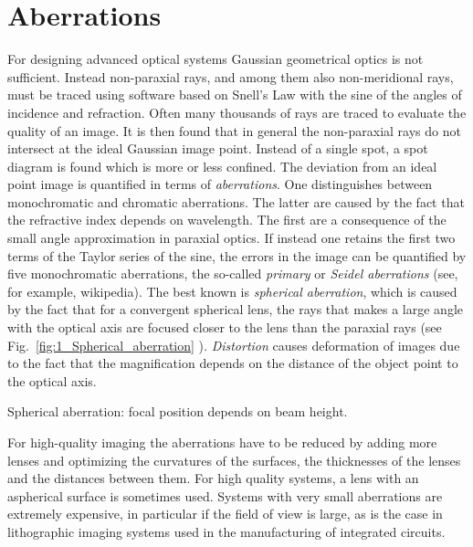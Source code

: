 \section{Aberrations}
For designing advanced optical systems Gaussian geometrical optics is not sufficient. 
Instead non-paraxial rays, and among them also non-meridional rays, must be traced  using software based on Snell's Law with the sine of the angles of incidence and refraction. Often many thousands of rays are  traced to evaluate the quality of an image. 
It is then found that in general the non-paraxial rays do not intersect at the ideal Gaussian image point. Instead of a single spot, a spot diagram is found which is more or less confined. The deviation from an ideal point image  is quantified in terms of  \emph{aberrations}. One distinguishes between monochromatic and chromatic aberrations. The latter are caused by the fact that the refractive index depends on wavelength. The first are a consequence of the small angle approximation in paraxial optics. If instead one retains the first two terms of the Taylor series of the sine,  the errors in the image can be quantified by  five monochromatic aberrations, the so-called \emph{primary} or \emph{Seidel aberrations} (see, for example, wikipedia). The best known  is \emph{spherical aberration}, which is caused by the fact that for a convergent spherical lens, the rays that makes a large angle with the optical axis are focused closer to the lens than the paraxial rays (see Fig.~\ref{fig:1_Spherical_aberration}
). \emph{Distortion} causes deformation of images due to the fact that the magnification depends on the distance of the object point to the optical axis.



\begin{marginfigure}
   \caption{Spherical aberration: focal position depends on beam height.}
\label{fig:1_Spherical_aberration}
\end{marginfigure}



For high-quality imaging the aberrations have to be reduced by adding more lenses and optimizing  the curvatures of the surfaces, the thicknesses of the lenses and  the distances between them. For high quality systems,  a lens with an aspherical surface is sometimes used.  Systems with very small aberrations are extremely expensive, in particular if the field of view is large, as is the case in  lithographic imaging systems used in the manufacturing of integrated circuits.




